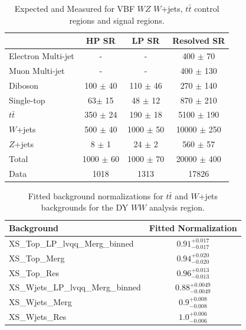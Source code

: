 \begin{table}
\begin{tabular}{|l|c|c|c|}
\hline
	  &	 HP SR &	 LP SR &	Resolved SR \\\hline 
	Electron Multi-jet &	- &	- &	400 $\pm$ 70\\\hline 
	Muon Multi-jet &	- &	- &	400 $\pm$ 130 \\\hline 
	Diboson &	100 $\pm$ 40 &	110 $\pm$ 46 &	270 $\pm$ 140 \\\hline 
	Single-top &	63$\pm$ 15&	48 $\pm$ 12 &	870 $\pm$ 210 \\\hline 
	$t\bar{t}$ &	350 $\pm$ 24 &	190 $\pm$ 18 &	5100 $\pm$ 190 \\\hline 
	$W$+jets &	500 $\pm$ 40 &	1000 $\pm$ 50 &	10000 $\pm$ 250 \\\hline 
	$Z$+jets &	8 $\pm$ 1 &	24 $\pm$ 2 &	560 $\pm$ 57 \\\hline 
	Total &	1000 $\pm$ 60 &	1000 $\pm$ 70 &	20000 $\pm$ 400 \\\hline 
	Data &	1018 &	1313 &	17826 \\\hline 
\end{tabular}
\caption{Expected and Measured for VBF $WZ$ $W$+jets, $t\bar{t}$ control regions and signal regions.}
\label{tbl:hvwzvbf_yields}

\end{table}

\begin{table}
\begin{tabular}{|l|c|}
\hline
Background & Fitted Normalization \\\hline
XS\_Top\_LP\_lvqq\_Merg\_binned & $0.91^{+0.017}_{-0.017}$ \\\hline
XS\_Top\_Merg & $0.94^{+0.020}_{-0.020}$ \\\hline
XS\_Top\_Res & $0.96^{+0.013}_{-0.013}$ \\\hline
XS\_Wjets\_LP\_lvqq\_Merg\_binned & $0.88^{+0.0049}_{-0.0049}$ \\\hline
XS\_Wjets\_Merg & $0.9^{+0.008}_{-0.008}$ \\\hline
XS\_Wjets\_Res & $1.0^{+0.006}_{-0.006}$ \\\hline

\end{tabular}
\caption{Fitted background normalizations for $t\bar{t}$ and $W$+jets backgrounds for the DY $WW$ analysis region.}
\label{tbl:hvtww_norm}
\end{table}



